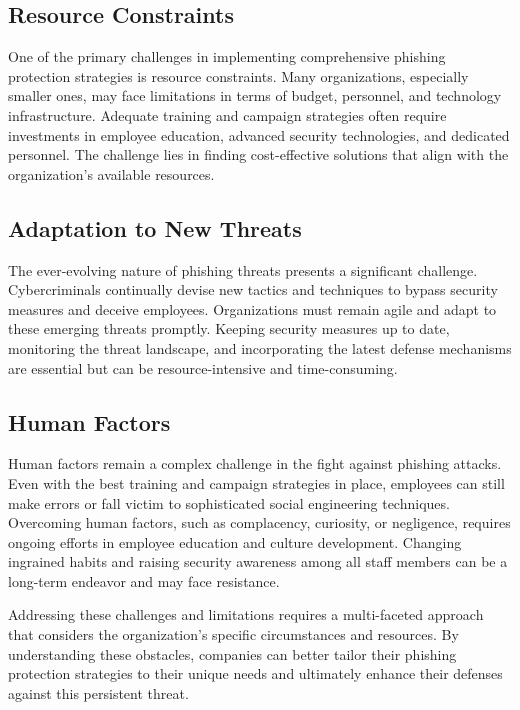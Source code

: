 \documentclass[conference]{IEEEtran}
\begin{document}
\subsection{Resource Constraints}
One of the primary challenges in implementing comprehensive phishing protection strategies is resource constraints. Many organizations, especially smaller ones, may face limitations in terms of budget, personnel, and technology infrastructure. Adequate training and campaign strategies often require investments in employee education, advanced security technologies, and dedicated personnel. The challenge lies in finding cost-effective solutions that align with the organization's available resources.

\subsection{Adaptation to New Threats}
The ever-evolving nature of phishing threats presents a significant challenge. Cybercriminals continually devise new tactics and techniques to bypass security measures and deceive employees. Organizations must remain agile and adapt to these emerging threats promptly. Keeping security measures up to date, monitoring the threat landscape, and incorporating the latest defense mechanisms are essential but can be resource-intensive and time-consuming.

\subsection{ Human Factors}
Human factors remain a complex challenge in the fight against phishing attacks. Even with the best training and campaign strategies in place, employees can still make errors or fall victim to sophisticated social engineering techniques. Overcoming human factors, such as complacency, curiosity, or negligence, requires ongoing efforts in employee education and culture development. Changing ingrained habits and raising security awareness among all staff members can be a long-term endeavor and may face resistance.

Addressing these challenges and limitations requires a multi-faceted approach that considers the organization's specific circumstances and resources. By understanding these obstacles, companies can better tailor their phishing protection strategies to their unique needs and ultimately enhance their defenses against this persistent threat.

\end{document}
